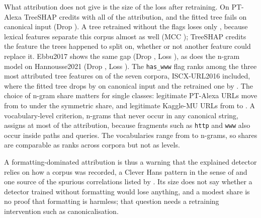 What attribution does not give is the size of the loss after retraining. On PT-Alexa TreeSHAP credits \texttt{\ShTopPTAlexa} with all of the attribution, and the fitted tree fails on canonical input (Drop \ShTreeSamePTAlexa). A tree retrained without the flags loses only \ShTreeDepPTAlexa{}, because lexical features separate this corpus almost as well (MCC \WPTAlexaRandomLexical); TreeSHAP credits the feature the trees happened to split on, whether or not another feature could replace it. Ebbu2017 shows the same gap (Drop \ShTreeSameEbbu, Loss \ShTreeDepEbbu), as does the n-gram model on Hannousse2021 (Drop \ShCharSameHannousse, Loss \ShCharDepHannousse). The \texttt{has\_www} flag ranks among the three most attributed tree features on \ShWwwTopThreeN{} of the seven corpora, ISCX-URL2016 included, where the fitted tree drops by \ShTreeSameISCXURL{} on canonical input and the retrained one by \ShTreeDepISCXURL. The choice of n-gram share matters for single classes: legitimate PT-Alexa URLs move from \ShCharOwnLegitPTAlexa{} to \ShCharSymLegitPTAlexa{} under the symmetric share, and legitimate Kaggle-MU URLs from \ShCharOwnLegitKaggleMU{} to \ShCharSymLegitKaggleMU. A vocabulary-level criterion, n-grams that never occur in any canonical string, assigns at most \ShCharFmtOnlyMax{} of the attribution, because fragments such as \texttt{http} and \texttt{www} also occur inside paths and queries. The vocabularies range from \ShVocabMin{} to \ShVocabMax{} n-grams, so shares are comparable as ranks across corpora but not as levels.

A formatting-dominated attribution is thus a warning that the explained detector relies on how a corpus was recorded, a Clever Hans pattern in the sense of \citet{lapuschkin2019} and one source of the spurious correlations listed by \citet{arp2022}. Its size does not say whether a detector trained without formatting would lose anything, and a modest share is no proof that formatting is harmless; that question needs a retraining intervention such as canonicalisation.


